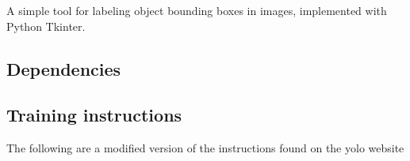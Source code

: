 A simple tool for labeling object bounding boxes in images, implemented with Python Tkinter.

\subsection*{Dependencies}


\begin{DoxyCode}{0}
\end{DoxyCode}


\subsection*{Training instructions}

The following are a modified version of the instructions found on the yolo website


